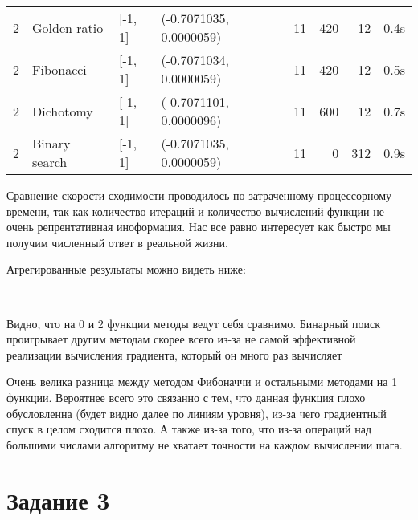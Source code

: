\documentclass{article}
\begin{document}
\begin{tabular}{rlllrrrl}
        2 &   Golden ratio &     [-1, 1] &   (-0.7071035, 0.0000059) &          11 &             420 &              12 &         0.4s \\
        2 &      Fibonacci &     [-1, 1] &   (-0.7071034, 0.0000059) &          11 &             420 &              12 &         0.5s \\
        2 &      Dichotomy &     [-1, 1] &   (-0.7071101, 0.0000096) &          11 &             600 &              12 &         0.7s \\
        2 &  Binary search &     [-1, 1] &   (-0.7071035, 0.0000059) &          11 &               0 &             312 &         0.9s \\
\bottomrule
\end{tabular}


    

    Сравнение скорости сходимости проводилось по затраченному процессорному
времени, так как количество итераций и количество вычислений функции не
очень репрентативная иноформация. Нас все равно интересует как быстро мы
получим численный ответ в реальной жизни.

Агрегированные результаты можно видеть ниже:

    \begin{center}
    \end{center}
    { \hspace*{\fill} \\}
    
    Видно, что на 0 и 2 функции методы ведут себя сравнимо. Бинарный поиск
проигрывает другим методам скорее всего из-за не самой эффективной
реализации вычисления градиента, который он много раз вычисляет

Очень велика разница между методом Фибоначчи и остальными методами на 1
функции. Вероятнее всего это связанно с тем, что данная функция плохо
обусловленна (будет видно далее по линиям уровня), из-за чего
градиентный спуск в целом сходится плохо. А также из-за того, что из-за
операций над большими числами алгоритму не хватает точности на каждом
вычислении шага.

    \newpage

\hypertarget{ux437ux430ux434ux430ux43dux438ux435-3}{%
\section{Задание 3}\label{ux437ux430ux434ux430ux43dux438ux435-3}}
\end{document}
